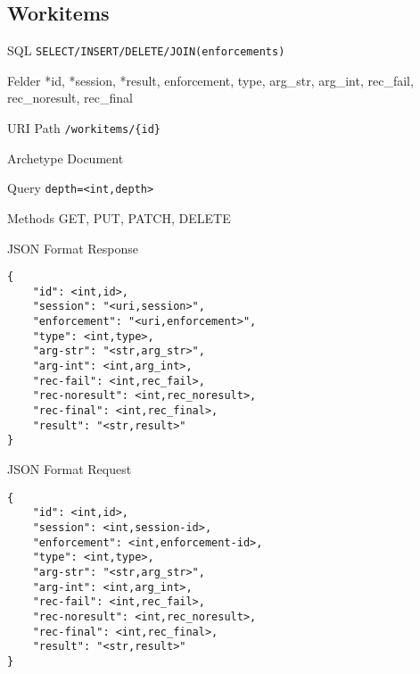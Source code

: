 \documentclass[10pt,a4paper]{scrartcl}
\begin{document}
\pagebreak
\subsection{Workitems}

\begin{description*}
	\item[SQL] \texttt{SELECT/INSERT/DELETE/JOIN(enforcements)}
	\item[Felder] *id, *session, *result, enforcement, type, arg\_str, arg\_int, rec\_fail, rec\_noresult, rec\_final
\end{description*}

\begin{mdframed}[style=def]
\begin{description*}
	\item[URI Path] \texttt{/workitems/\{id\}}
	\item[Archetype] Document
	\item[Query] \texttt{depth=<int,depth>}
	\item[Methods] GET, PUT, PATCH, DELETE
	\item[JSON Format Response] \hfill
\begin{lstlisting}
{
	"id": <int,id>,
	"session": "<uri,session>",
	"enforcement": "<uri,enforcement>",
	"type": <int,type>,
	"arg-str": "<str,arg_str>",
	"arg-int": <int,arg_int>,
	"rec-fail": <int,rec_fail>,
	"rec-noresult": <int,rec_noresult>, 
	"rec-final": <int,rec_final>,
	"result": "<str,result>"
}
\end{lstlisting}
\item[JSON Format Request] \hfill
\begin{lstlisting}
{
	"id": <int,id>,
	"session": <int,session-id>,
	"enforcement": <int,enforcement-id>,
	"type": <int,type>,
	"arg-str": "<str,arg_str>",
	"arg-int": <int,arg_int>,
	"rec-fail": <int,rec_fail>,
	"rec-noresult": <int,rec_noresult>, 
	"rec-final": <int,rec_final>,
	"result": "<str,result>"
}
\end{lstlisting}
\end{description*}
\end{mdframed}
\end{document}
